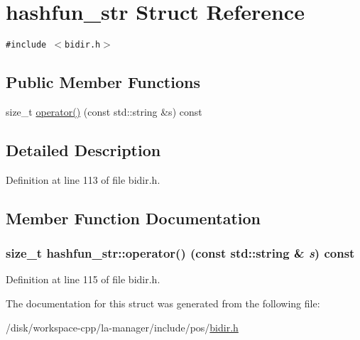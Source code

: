 \hypertarget{structhashfun__str}{
\section{hashfun\_\-str Struct Reference}
\label{structhashfun__str}
}
{\tt \#include $<$bidir.h$>$}

\subsection*{Public Member Functions}
\begin{CompactItemize}
\item 
size\_\-t \hyperlink{structhashfun__str_e1c818dad587280da2be34236fb45dbb}{operator()} (const std::string \&s) const 
\end{CompactItemize}


\subsection{Detailed Description}


Definition at line 113 of file bidir.h.

\subsection{Member Function Documentation}
\hypertarget{structhashfun__str_e1c818dad587280da2be34236fb45dbb}{
\subsubsection[{operator()}]{\setlength{\rightskip}{0pt plus 5cm}size\_\-t hashfun\_\-str::operator() (const std::string \& {\em s}) const}}
\label{structhashfun__str_e1c818dad587280da2be34236fb45dbb}




Definition at line 115 of file bidir.h.

The documentation for this struct was generated from the following file:\begin{CompactItemize}
\item 
/disk/workspace-cpp/la-manager/include/pos/\hyperlink{bidir_8h}{bidir.h}\end{CompactItemize}
